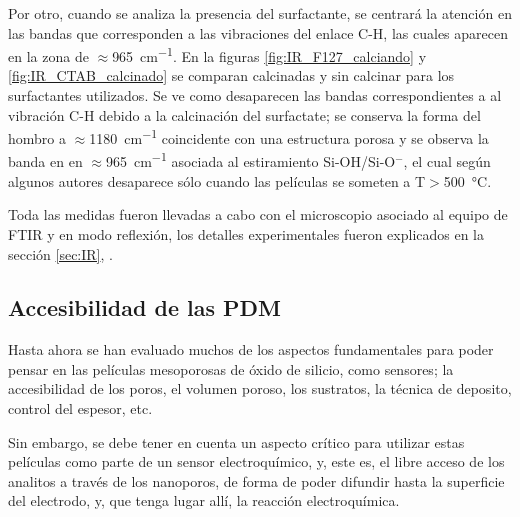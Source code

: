 		Por otro, cuando se analiza la presencia del surfactante, se centrará la atención en las bandas que corresponden a las vibraciones del enlace C-H, las cuales aparecen en la zona de $\approx$\SI{965}{\cm^{-1}}. En la figuras \ref{fig:IR_F127_calciando} y \ref{fig:IR_CTAB_calcinado} se comparan \pdm\space calcinadas y sin calcinar para los surfactantes utilizados. Se ve como desaparecen las bandas correspondientes a al vibración C-H debido a la calcinación del surfactate; se conserva la forma del hombro a $\approx$\SI{1180}{\cm^{-1}} coincidente con una estructura porosa y se observa la banda en en $\approx$\SI{965}{\cm^{-1}} asociada al estiramiento Si-OH/Si-O$^-$, el cual según algunos autores desaparece sólo cuando las películas se someten a T$>$\SI{500}{\celsius}.\cite{Innocenzi2003,Almeida1990,Bertoluzza1982}
	
		Toda las medidas fueron llevadas a cabo con el microscopio asociado al equipo de FTIR y en modo reflexión, los detalles experimentales fueron explicados en la sección \ref{sec:IR}, \pageref{sec:IR}. %


	\subsection{Accesibilidad de las PDM}

			Hasta ahora se han evaluado muchos de los aspectos fundamentales para poder pensar en las películas mesoporosas de óxido de silicio, como sensores; la accesibilidad de los poros, el volumen poroso, los sustratos, la técnica de deposito, control del espesor, etc. 

			Sin embargo, se debe tener en cuenta un aspecto crítico para utilizar estas películas como parte de un sensor electroquímico, y, este es, el libre acceso de los analitos a través de los nanoporos, de forma de poder difundir hasta la superficie del electrodo, y, que tenga lugar allí, la reacción electroquímica.

